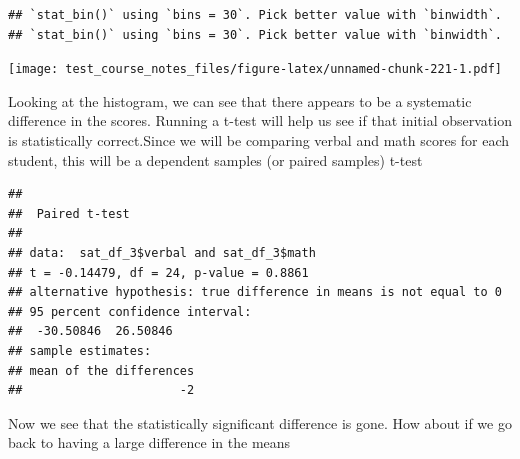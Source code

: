 \documentclass[
]{book}
\newenvironment{Shaded}{\begin{snugshade}}{\end{snugshade}}
\newcommand{\AttributeTok}[1]{\textcolor[rgb]{0.77,0.63,0.00}{#1}}
\newcommand{\CommentTok}[1]{\textcolor[rgb]{0.56,0.35,0.01}{\textit{#1}}}
\newcommand{\ConstantTok}[1]{\textcolor[rgb]{0.00,0.00,0.00}{#1}}
\newcommand{\FunctionTok}[1]{\textcolor[rgb]{0.00,0.00,0.00}{#1}}
\newcommand{\NormalTok}[1]{#1}
\newcommand{\OtherTok}[1]{\textcolor[rgb]{0.56,0.35,0.01}{#1}}
\newcommand{\SpecialCharTok}[1]{\textcolor[rgb]{0.00,0.00,0.00}{#1}}
\begin{document}
\begin{verbatim}
## `stat_bin()` using `bins = 30`. Pick better value with `binwidth`.
## `stat_bin()` using `bins = 30`. Pick better value with `binwidth`.
\end{verbatim}

\texttt{[image: test\_course\_notes\_files/figure-latex/unnamed-chunk-221-1.pdf]}

Looking at the histogram, we can see that there appears to be a systematic difference in the scores. Running a t-test will help us see if that initial observation is statistically correct.Since we will be comparing verbal and math scores for each student, this will be a dependent samples (or paired samples) t-test

\begin{Shaded}
\end{Shaded}

\begin{verbatim}
## 
##  Paired t-test
## 
## data:  sat_df_3$verbal and sat_df_3$math
## t = -0.14479, df = 24, p-value = 0.8861
## alternative hypothesis: true difference in means is not equal to 0
## 95 percent confidence interval:
##  -30.50846  26.50846
## sample estimates:
## mean of the differences 
##                      -2
\end{verbatim}

Now we see that the statistically significant difference is gone. How about if we go back to having a large difference in the means
\end{document}
